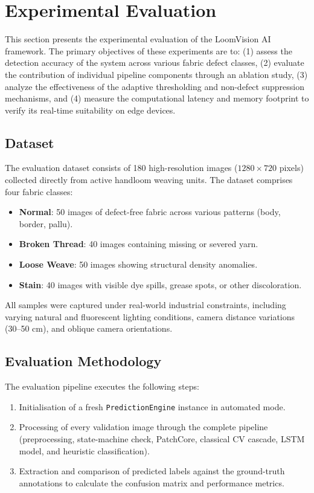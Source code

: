 \documentclass{ieeeaccess}
\begin{document}
\section{Experimental Evaluation}

This section presents the experimental evaluation of the LoomVision AI framework. The primary objectives of these experiments are to: (1) assess the detection accuracy of the system across various fabric defect classes, (2) evaluate the contribution of individual pipeline components through an ablation study, (3) analyze the effectiveness of the adaptive thresholding and non-defect suppression mechanisms, and (4) measure the computational latency and memory footprint to verify its real-time suitability on edge devices.

\subsection{Dataset}
The evaluation dataset consists of 180 high-resolution images ($1280 \times 720$ pixels) collected directly from active handloom weaving units. The dataset comprises four fabric classes:
\begin{itemize}
    \item \textbf{Normal}: 50 images of defect-free fabric across various patterns (body, border, pallu).
    \item \textbf{Broken Thread}: 40 images containing missing or severed yarn.
    \item \textbf{Loose Weave}: 50 images showing structural density anomalies.
    \item \textbf{Stain}: 40 images with visible dye spills, grease spots, or other discoloration.
\end{itemize}
All samples were captured under real-world industrial constraints, including varying natural and fluorescent lighting conditions, camera distance variations (30--50 cm), and oblique camera orientations.

\subsection{Evaluation Methodology}
The evaluation pipeline executes the following steps:
\begin{enumerate}
    \item Initialisation of a fresh \texttt{PredictionEngine} instance in automated mode.
    \item Processing of every validation image through the complete pipeline (preprocessing, state-machine check, PatchCore, classical CV cascade, LSTM model, and heuristic classification).
    \item Extraction and comparison of predicted labels against the ground-truth annotations to calculate the confusion matrix and performance metrics.
\end{enumerate}
\end{document}
